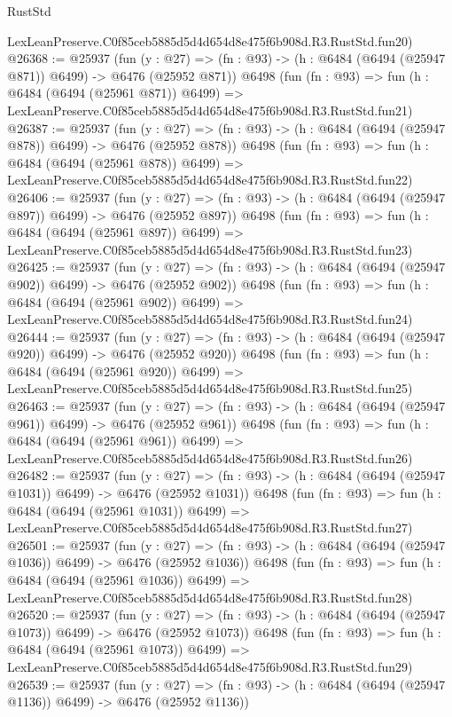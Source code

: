 \begin{lexlean}{RustStd}
\begin{coremodule}
    LexLeanPreserve.C0f85ceb5885d5d4d654d8e475f6b908d.R3.RustStd.fun20)
@26368 := @25937
    (fun (y : @27) => (fn : @93) -> (h : @6484 (@6494 (@25947 @871)) @6499) -> @6476 (@25952 @871))
    @6498
    (fun (fn : @93) =>
    fun (h : @6484 (@6494 (@25961 @871)) @6499) =>
    LexLeanPreserve.C0f85ceb5885d5d4d654d8e475f6b908d.R3.RustStd.fun21)
@26387 := @25937
    (fun (y : @27) => (fn : @93) -> (h : @6484 (@6494 (@25947 @878)) @6499) -> @6476 (@25952 @878))
    @6498
    (fun (fn : @93) =>
    fun (h : @6484 (@6494 (@25961 @878)) @6499) =>
    LexLeanPreserve.C0f85ceb5885d5d4d654d8e475f6b908d.R3.RustStd.fun22)
@26406 := @25937
    (fun (y : @27) => (fn : @93) -> (h : @6484 (@6494 (@25947 @897)) @6499) -> @6476 (@25952 @897))
    @6498
    (fun (fn : @93) =>
    fun (h : @6484 (@6494 (@25961 @897)) @6499) =>
    LexLeanPreserve.C0f85ceb5885d5d4d654d8e475f6b908d.R3.RustStd.fun23)
@26425 := @25937
    (fun (y : @27) => (fn : @93) -> (h : @6484 (@6494 (@25947 @902)) @6499) -> @6476 (@25952 @902))
    @6498
    (fun (fn : @93) =>
    fun (h : @6484 (@6494 (@25961 @902)) @6499) =>
    LexLeanPreserve.C0f85ceb5885d5d4d654d8e475f6b908d.R3.RustStd.fun24)
@26444 := @25937
    (fun (y : @27) => (fn : @93) -> (h : @6484 (@6494 (@25947 @920)) @6499) -> @6476 (@25952 @920))
    @6498
    (fun (fn : @93) =>
    fun (h : @6484 (@6494 (@25961 @920)) @6499) =>
    LexLeanPreserve.C0f85ceb5885d5d4d654d8e475f6b908d.R3.RustStd.fun25)
@26463 := @25937
    (fun (y : @27) => (fn : @93) -> (h : @6484 (@6494 (@25947 @961)) @6499) -> @6476 (@25952 @961))
    @6498
    (fun (fn : @93) =>
    fun (h : @6484 (@6494 (@25961 @961)) @6499) =>
    LexLeanPreserve.C0f85ceb5885d5d4d654d8e475f6b908d.R3.RustStd.fun26)
@26482 := @25937
    (fun (y : @27) =>
    (fn : @93) -> (h : @6484 (@6494 (@25947 @1031)) @6499) -> @6476 (@25952 @1031))
    @6498
    (fun (fn : @93) =>
    fun (h : @6484 (@6494 (@25961 @1031)) @6499) =>
    LexLeanPreserve.C0f85ceb5885d5d4d654d8e475f6b908d.R3.RustStd.fun27)
@26501 := @25937
    (fun (y : @27) =>
    (fn : @93) -> (h : @6484 (@6494 (@25947 @1036)) @6499) -> @6476 (@25952 @1036))
    @6498
    (fun (fn : @93) =>
    fun (h : @6484 (@6494 (@25961 @1036)) @6499) =>
    LexLeanPreserve.C0f85ceb5885d5d4d654d8e475f6b908d.R3.RustStd.fun28)
@26520 := @25937
    (fun (y : @27) =>
    (fn : @93) -> (h : @6484 (@6494 (@25947 @1073)) @6499) -> @6476 (@25952 @1073))
    @6498
    (fun (fn : @93) =>
    fun (h : @6484 (@6494 (@25961 @1073)) @6499) =>
    LexLeanPreserve.C0f85ceb5885d5d4d654d8e475f6b908d.R3.RustStd.fun29)
@26539 := @25937
    (fun (y : @27) =>
    (fn : @93) -> (h : @6484 (@6494 (@25947 @1136)) @6499) -> @6476 (@25952 @1136))

\end{coremodule}
\end{lexlean}
